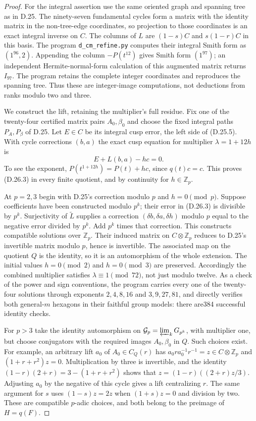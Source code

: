 \begin{proof}
For the integral assertion use the same oriented graph and
spanning tree as in D.25. The ninety-seven fundamental cycles
form a matrix with the identity matrix in the non-tree-edge
coordinates, so projection to those coordinates is an exact
integral inverse on $C$. The columns of $L$ are
$(1-s)C$ and $s(1-r)C$ in this basis. The program
\texttt{d\_cm\_refine.py} computes their integral Smith form
as $(1^{96},2)$. Appending the column $-P(t^{12})$ gives
Smith form $(1^{97})$; an independent Hermite-normal-form
calculation of this augmented matrix returns $I_{97}$.
The program retains the complete integer coordinates and
reproduces the spanning tree. Thus these are integer-image
computations, not deductions from ranks modulo two and three.

We construct the lift, retaining the multiplier's full
residue. Fix one of the twenty-four certified matrix pairs
$A_0,\beta_0$ and choose the fixed integral paths $P_A,P_\beta$
of D.25. Let $E\in C$ be its integral cusp error, the left
side of (D.25.5). With cycle corrections $(b,a)$ the exact
cusp equation for multiplier $\lambda=1+12h$ is
\[
       E+L(b,a)-hc=0.                                  \tag{D.26.3}
\]
To see the exponent, $P(t^{1+12h})=P(t)+hc$, since
$q(t)c=c$. This proves (D.26.3) in every finite quotient,
and by continuity for $h\in\mathbb Z_p$.

At $p=2,3$ begin with D.25's correction modulo $p$ and
$h=0\pmod p$. Suppose coefficients have been constructed
modulo $p^k$; their error in (D.26.3) is divisible by $p^k$.
Surjectivity of $\widetilde L$ supplies a correction
$(\delta b,\delta a,\delta h)$ modulo $p$ equal to the
negative error divided by $p^k$. Add $p^k$ times that
correction. This constructs compatible solutions over
$\mathbb Z_p$. Their induced matrix on $C\otimes\mathbb Z_p$
reduces to D.25's invertible matrix modulo $p$, hence is
invertible. The associated map on the quotient $Q$ is the
identity, so it is an automorphism of the whole extension.
The initial values $h=0\pmod2$ and $h=0\pmod3$ are
preserved. Accordingly the combined multiplier satisfies
$\lambda\equiv1\pmod{72}$, not just modulo twelve.
As a check of the power and sign conventions, the program
carries every one of the twenty-four solutions through
exponents $2,4,8,16$ and $3,9,27,81$, and directly verifies
both general-$m$ hexagons in their faithful group models:
there are384 successful identity checks.

For $p>3$ take the identity automorphism on
$\mathcal G_p=\varprojlim_k G_{p^k}$, with multiplier one,
but choose conjugators with the required images
$A_0,\beta_0$ in $Q$. Such choices exist. For example,
an arbitrary lift $a_0$ of $A_0\in C_Q(r)$ has
$a_0ra_0^{-1}r^{-1}=z\in C\otimes\mathbb Z_p$ and
$(1+r+r^2)z=0$. Multiplication by three is invertible,
and the identity
$(1-r)(2+r)=3-(1+r+r^2)$ shows that
$z=(1-r)((2+r)z/3)$. Adjusting $a_0$ by the negative of
this cycle gives a lift centralizing $r$. The same argument
for $s$ uses $(1-s)z=2z$ when $(1+s)z=0$ and division by
two. These are compatible $p$-adic choices, and both belong
to the preimage of $H=q(F)$.


\end{proof}
